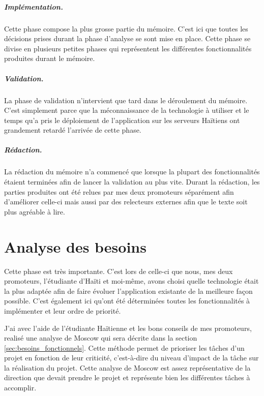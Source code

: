 \documentclass{EPL-master-thesis-covers-FR}
\begin{document}
			\paragraph*{Implémentation.} 
			Cette phase compose la plus grosse partie du mémoire. C'est ici que toutes les décisions prises durant la phase d'analyse se sont mise en place. Cette phase se divise en plusieurs petites phases qui représentent les différentes fonctionnalités produites durant le mémoire. 
			
			\paragraph*{Validation.}
			La phase de validation n'intervient que tard dans le déroulement du mémoire. C'est simplement parce que la méconnaissance de la technologie à utiliser et le temps qu'a pris le déploiement de l'application sur les serveurs Haïtiens ont grandement retardé l'arrivée de cette phase.			
			
			\paragraph*{Rédaction.}
			La rédaction du mémoire n'a commencé que lorsque la plupart des fonctionnalités étaient terminées afin de lancer la validation au plus vite. Durant la rédaction, les parties produites ont été relues par mes deux promoteurs séparément afin d'améliorer celle-ci mais aussi par des relecteurs externes afin que le texte soit plus agréable à lire. 
			
			
			
			
			

	\chapter{Analyse des besoins}
		\label{sec:analyse_besoins}
		Cette phase est très importante. C'est lors de celle-ci que nous, mes deux promoteurs, l'étudiante d'Haïti et moi-même, avons choisi quelle technologie était la plus adaptée afin de faire évoluer l'application existante de la meilleure façon possible. C'est également ici qu'ont été déterminées toutes les fonctionnalités à implémenter et leur ordre de priorité.
		
		J'ai avec l'aide de l'étudiante Haïtienne et les bons conseils de mes promoteurs, realisé une analyse de Moscow qui sera décrite dans la section \ref{sec:besoins_fonctionnels}. Cette méthode permet de prioriser les tâches d'un projet en fonction de leur criticité, c'est-à-dire du niveau d'impact de la tâche sur la réalisation du projet.
		Cette analyse de Moscow est assez représentative de la direction que devait prendre le projet et représente bien les différentes tâches à accomplir.
\end{document}
